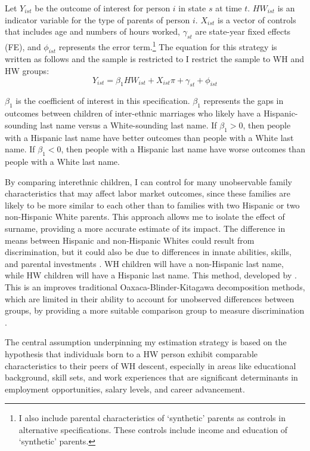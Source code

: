 Let $Y_{ist}$ be the outcome of interest for person $i$ in state $s$ at time $t$. $HW_{ist}$ is an indicator variable for the type of parents of person $i$. $X_{ist}$ is a vector of controls that includes age and numbers of hours worked, $\gamma_{st}$ are state-year fixed effects (FE), and $\phi_{ist}$ represents the error term.\footnote{I also include parental characteristics of `synthetic' parents as controls in alternative specifications. These controls include income and education of `synthetic' parents.} The equation for this strategy is written as follows and the sample is restricted to I restrict the sample to WH and HW groups:
\begin{equation} \label{eq:1a}
Y_{ist} = \beta_{1} HW_{ist} + X_{ist} \pi + \gamma_{st} + \phi_{ist}
\end{equation}

$\beta_{1}$ is the coefficient of interest in this specification. $\beta_{1}$ represents the gaps in outcomes between children of inter-ethnic marriages who likely have a Hispanic-sounding last name versus a White-sounding last name. If $\beta_{1} > 0$, then people with a Hispanic last name have better outcomes than people with a White last name. If $\beta_{1} < 0$, then people with a Hispanic last name have worse outcomes than people with a White last name.

By comparing interethnic children, I can control for many unobservable family characteristics that may affect labor market outcomes, since these families are likely to be more similar to each other than to families with two Hispanic or two non-Hispanic White parents. This approach allows me to isolate the effect of surname, providing a more accurate estimate of its impact. The difference in means between Hispanic and non-Hispanic Whites could result from discrimination, but it could also be due to differences in innate abilities, skills, and parental investments . WH children will have a non-Hispanic last name, while HW children will have a Hispanic last name. This method, developed by \textcite{rubinstein2014pride}. This is an improves traditional Oaxaca-Blinder-Kitagawa decomposition methods, which are limited in their ability to account for unobserved differences between groups, by providing a more suitable comparison group to measure discrimination \autocite{oaxaca1973male,blinder1973wage,kitagawa1955components}.

The central assumption underpinning my estimation strategy is based on the hypothesis that individuals born to a HW person exhibit comparable characteristics to their peers of WH descent, especially in areas like educational background, skill sets, and work experiences that are significant determinants in employment opportunities, salary levels, and career advancement.

